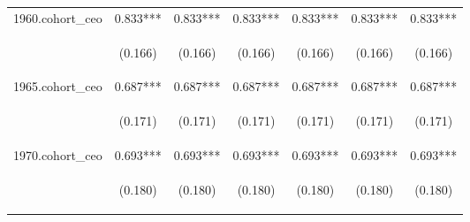 \begin{center}
\begin{tabular}{lcccccc}
1960.cohort\_ceo & 0.833*** & 0.833*** & 0.833*** & 0.833*** & 0.833*** & 0.833*** \\
\vspace{4pt} & \begin{footnotesize}(0.166)\end{footnotesize} & \begin{footnotesize}(0.166)\end{footnotesize} & \begin{footnotesize}(0.166)\end{footnotesize} & \begin{footnotesize}(0.166)\end{footnotesize} & \begin{footnotesize}(0.166)\end{footnotesize} & \begin{footnotesize}(0.166)\end{footnotesize} \\
1965.cohort\_ceo & 0.687*** & 0.687*** & 0.687*** & 0.687*** & 0.687*** & 0.687*** \\
\vspace{4pt} & \begin{footnotesize}(0.171)\end{footnotesize} & \begin{footnotesize}(0.171)\end{footnotesize} & \begin{footnotesize}(0.171)\end{footnotesize} & \begin{footnotesize}(0.171)\end{footnotesize} & \begin{footnotesize}(0.171)\end{footnotesize} & \begin{footnotesize}(0.171)\end{footnotesize} \\
1970.cohort\_ceo & 0.693*** & 0.693*** & 0.693*** & 0.693*** & 0.693*** & 0.693*** \\
\vspace{4pt} & \begin{footnotesize}(0.180)\end{footnotesize} & \begin{footnotesize}(0.180)\end{footnotesize} & \begin{footnotesize}(0.180)\end{footnotesize} & \begin{footnotesize}(0.180)\end{footnotesize} & \begin{footnotesize}(0.180)\end{footnotesize} & \begin{footnotesize}(0.180)\end{footnotesize} \\

\end{tabular}
\end{center}
